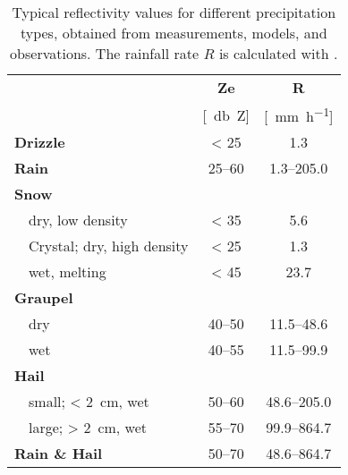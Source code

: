 \begin{table}[t!]
	\begin{center}
		\caption{Typical reflectivity values for different precipitation types, obtained from measurements, models, and observations. The rainfall rate $R$ is calculated with  \citep{doviak_doppler_1993}. }\label{tab:ref_values}
		\begin{tabular}{ll|c|c}
			\hline \hline
			\multicolumn{2}{l|}{} & \textbf{Ze} & \textbf{R} \\ 
			\multicolumn{2}{l|}{} & [\SI{}{\decibel Z}] & [\SI{}{\mm\per\hour}] \\ \hline \hline
			\multicolumn{2}{l|}{\textbf{Drizzle}} & \num{< 25} &  \num{1.3} \\ \hline
			\multicolumn{2}{l|}{\textbf{Rain}} & \numrange{25}{60} & \numrange{1.3}{205.0} \\ \hline
			\multicolumn{2}{l|}{\textbf{Snow}} &  \\ 
			& dry, low density 	& \num{< 35} & \num{5.6}\\ \hline
			& Crystal; dry, high density & \num{< 25} & \num{1.3}\\ \hline
			& wet, melting 		& \num{< 45} & \num{23.7} \\ \hline
			\multicolumn{2}{l|}{\textbf{Graupel}} & \\
			& dry 				& \numrange{40}{50} & \numrange{11.5}{48.6} \\ \hline
			& wet				& \numrange{40}{55} & \numrange{11.5}{99.9} \\ \hline
			\multicolumn{2}{l|}{\textbf{Hail}} & \\
			& small; \SI{< 2}{\cm}, wet & \numrange{50}{60} & \numrange{48.6}{205.0}\\
			& large; \SI{> 2}{\cm}, wet & \numrange{55}{70} & \numrange{99.9}{864.7}\\ \hline
			\multicolumn{2}{l|}{\textbf{Rain \& Hail}} & \numrange{50}{70} & \numrange{48.6}{864.7} \\ 
			\hline \hline
		\end{tabular}
	\end{center}
\end{table}

